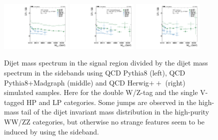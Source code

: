 \begin{figure}[h!]
\centering
\includegraphics[width=0.3\textwidth]{figures/analysis/search2/AN-16-235/plots/MjjSRvsSB_pythia8.pdf}
\includegraphics[width=0.3\textwidth]{figures/analysis/search2/AN-16-235/plots/MjjSRvsSB_pythia8Madgraph.pdf}
\includegraphics[width=0.3\textwidth]{figures/analysis/search2/AN-16-235/plots/MjjSRvsSB_herwig.pdf}
\caption{Dijet mass spectrum in the signal region divided by the dijet mass spectrum in the sidebands using QCD Pythia8 (left), QCD Pythia8+Madgraph (middle) and QCD Herwig$++$ (right) simulated samples. Here for the double W/Z-tag and the single V-tagged HP and LP categories. Some jumps are observed in the high-mass tail of the dijet invariant mass distribution in the high-purity WW/ZZ categories, but otherwise no strange features seem to be induced by using the sideband. }
\label{fig:NPVVvsCat}
\end{figure}

